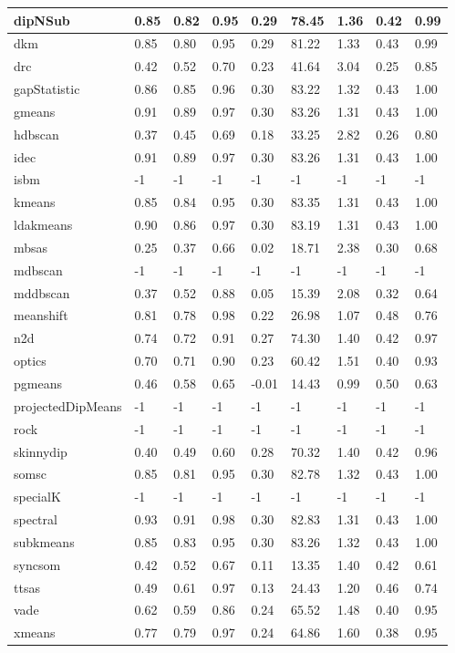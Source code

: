 \begin{table}[H]
\begin{tabular}{|l|l|l|l|l|l|l|l|l|}
\hline
dipNSub & 0.85 & 0.82 & 0.95 & 0.29 & 78.45 & 1.36 & 0.42 & 0.99 \\
\hline
dkm & 0.85 & 0.80 & 0.95 & 0.29 & 81.22 & 1.33 & 0.43 & 0.99 \\
\hline
drc & 0.42 & 0.52 & 0.70 & 0.23 & 41.64 & 3.04 & 0.25 & 0.85 \\
\hline
gapStatistic & 0.86 & 0.85 & 0.96 & 0.30 & 83.22 & 1.32 & 0.43 & 1.00 \\
\hline
gmeans & 0.91 & 0.89 & 0.97 & 0.30 & 83.26 & 1.31 & 0.43 & 1.00 \\
\hline
hdbscan & 0.37 & 0.45 & 0.69 & 0.18 & 33.25 & 2.82 & 0.26 & 0.80 \\
\hline
idec & 0.91 & 0.89 & 0.97 & 0.30 & 83.26 & 1.31 & 0.43 & 1.00 \\
\hline
isbm & -1 & -1 & -1 & -1 & -1 & -1 & -1 & -1 \\
\hline
kmeans & 0.85 & 0.84 & 0.95 & 0.30 & 83.35 & 1.31 & 0.43 & 1.00 \\
\hline
ldakmeans & 0.90 & 0.86 & 0.97 & 0.30 & 83.19 & 1.31 & 0.43 & 1.00 \\
\hline
mbsas & 0.25 & 0.37 & 0.66 & 0.02 & 18.71 & 2.38 & 0.30 & 0.68 \\
\hline
mdbscan & -1 & -1 & -1 & -1 & -1 & -1 & -1 & -1 \\
\hline
mddbscan & 0.37 & 0.52 & 0.88 & 0.05 & 15.39 & 2.08 & 0.32 & 0.64 \\
\hline
meanshift & 0.81 & 0.78 & 0.98 & 0.22 & 26.98 & 1.07 & 0.48 & 0.76 \\
\hline
n2d & 0.74 & 0.72 & 0.91 & 0.27 & 74.30 & 1.40 & 0.42 & 0.97 \\
\hline
optics & 0.70 & 0.71 & 0.90 & 0.23 & 60.42 & 1.51 & 0.40 & 0.93 \\
\hline
pgmeans & 0.46 & 0.58 & 0.65 & -0.01 & 14.43 & 0.99 & 0.50 & 0.63 \\
\hline
projectedDipMeans & -1 & -1 & -1 & -1 & -1 & -1 & -1 & -1 \\
\hline
rock & -1 & -1 & -1 & -1 & -1 & -1 & -1 & -1 \\
\hline
skinnydip & 0.40 & 0.49 & 0.60 & 0.28 & 70.32 & 1.40 & 0.42 & 0.96 \\
\hline
somsc & 0.85 & 0.81 & 0.95 & 0.30 & 82.78 & 1.32 & 0.43 & 1.00 \\
\hline
specialK & -1 & -1 & -1 & -1 & -1 & -1 & -1 & -1 \\
\hline
spectral & 0.93 & 0.91 & 0.98 & 0.30 & 82.83 & 1.31 & 0.43 & 1.00 \\
\hline
subkmeans & 0.85 & 0.83 & 0.95 & 0.30 & 83.26 & 1.32 & 0.43 & 1.00 \\
\hline
syncsom & 0.42 & 0.52 & 0.67 & 0.11 & 13.35 & 1.40 & 0.42 & 0.61 \\
\hline
ttsas & 0.49 & 0.61 & 0.97 & 0.13 & 24.43 & 1.20 & 0.46 & 0.74 \\
\hline
vade & 0.62 & 0.59 & 0.86 & 0.24 & 65.52 & 1.48 & 0.40 & 0.95 \\
\hline
xmeans & 0.77 & 0.79 & 0.97 & 0.24 & 64.86 & 1.60 & 0.38 & 0.95 \\
\hline
\end{tabular}
\end{table}